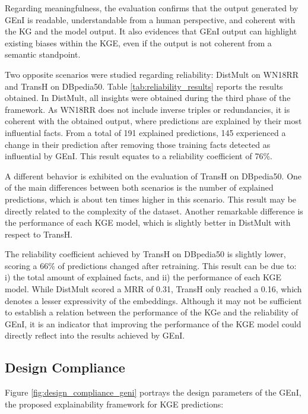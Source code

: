 Regarding meaningfulness, the evaluation confirms that the output generated by GEnI is readable, understandable from a human perspective, and coherent with the KG and the model output. It also evidences that GEnI output can highlight existing biases within the KGE, even if the output is not coherent from a semantic standpoint.

Two opposite scenarios were studied regarding reliability: DistMult on WN18RR and TransH on DBpedia50. Table \ref{tab:reliability_results} reports the results obtained. In DistMult, all insights were obtained during the third phase of the framework. As WN18RR does not include inverse triples or redundancies, it is coherent with the obtained output, where predictions are explained by their most influential facts. From a total of 191 explained predictions, 145 experienced a change in their prediction after removing those training facts detected as influential by GEnI. This result equates to a reliability coefficient of 76\%.

A different behavior is exhibited on the evaluation of TransH on DBpedia50. One of the main differences between both scenarios is the number of explained predictions, which is about ten times higher in this scenario. This result may be directly related to the complexity of the dataset. Another remarkable difference is the performance of each KGE model, which is slightly better in DistMult with respect to TransH.

The reliability coefficient achieved by TransH on DBpedia50 is slightly lower, scoring a 66\% of predictions changed after retraining. This result can be due to: i) the total amount of explained facts, and ii) the performance of each KGE model. While DistMult scored a MRR of 0.31, TransH only reached a 0.16, which denotes a lesser expressivity of the embeddings. Although it may not be sufficient to establish a relation between the performance of the KGe and the reliability of GEnI, it is an indicator that improving the performance of the KGE model could directly reflect into the results achieved by GEnI.

\subsection{Design Compliance}\label{6_sec:subsec:geni_design_compliance}
Figure \ref{fig:design_compliance_geni} portrays the design parameters of the GEnI, the proposed explainability framework for KGE predictions: 

